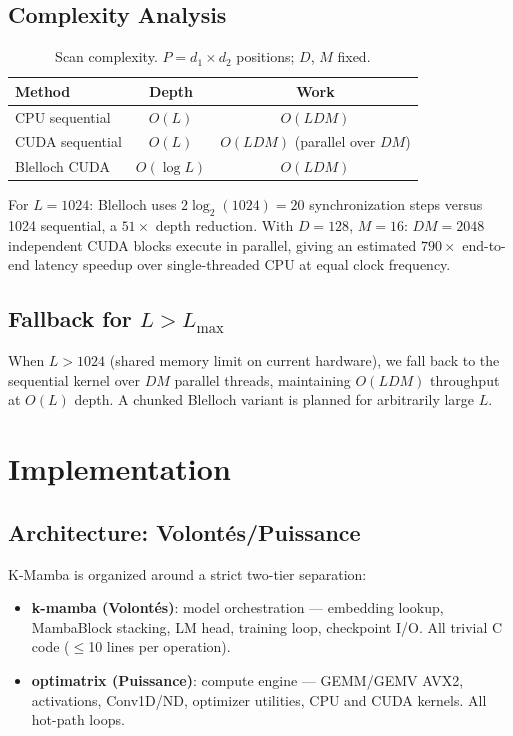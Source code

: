 \documentclass[10pt,onecolumn]{article}
\begin{document}
\subsection{Complexity Analysis}

\begin{table}[htbp]
\centering
\caption{Scan complexity. $P = d_1 \times d_2$ positions; $D$, $M$ fixed.}
\label{tab:complexity}
\begin{tabular}{lcc}
\toprule
Method & Depth & Work \\
\midrule
CPU sequential & $O(L)$ & $O(LDM)$ \\
CUDA sequential & $O(L)$ & $O(LDM)$ (parallel over $DM$) \\
Blelloch CUDA & $O(\log L)$ & $O(LDM)$ \\
\bottomrule
\end{tabular}
\end{table}

For $L = 1024$: Blelloch uses $2\log_2(1024) = 20$ synchronization steps
versus 1024 sequential, a $51\times$ depth reduction.
With $D = 128$, $M = 16$: $DM = 2048$ independent CUDA blocks execute in
parallel, giving an estimated $790\times$ end-to-end latency speedup over
single-threaded CPU at equal clock frequency.

\subsection{Fallback for $L > L_{\max}$}

When $L > 1024$ (shared memory limit on current hardware), we fall back
to the sequential kernel over $DM$ parallel threads, maintaining
$O(LDM)$ throughput at $O(L)$ depth. A chunked Blelloch variant
is planned for arbitrarily large $L$.

\section{Implementation}
\label{sec:implementation}

\subsection{Architecture: Volontés/Puissance}

K-Mamba is organized around a strict two-tier separation:

\begin{itemize}
  \item \textbf{k-mamba (Volontés)}: model orchestration —
        embedding lookup, MambaBlock stacking, LM head,
        training loop, checkpoint I/O. All trivial C code ($\leq$10 lines per operation).
  \item \textbf{optimatrix (Puissance)}: compute engine —
        GEMM/GEMV AVX2, activations, Conv1D/ND, optimizer utilities,
        CPU and CUDA kernels. All hot-path loops.
\end{itemize}
\end{document}
